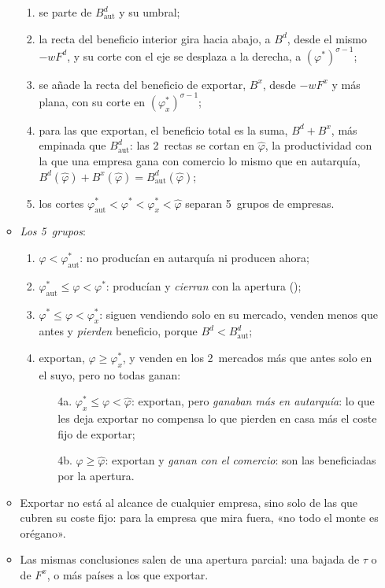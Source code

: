 \documentclass[11pt]{article}
\begin{document}
\begin{itemize}
\begin{itemize}
\begin{enumerate}
    \item se parte de $B^d_{\mathrm{aut}}$ y su umbral;
    \item la recta del beneficio interior gira hacia abajo, a $B^d$, desde el mismo $-wF^d$, y su corte con el eje se desplaza a la derecha, a $(\varphi^*)^{\sigma-1}$;
    \item se añade la recta del beneficio de exportar, $B^x$, desde $-wF^x$ y más plana, con su corte en $(\varphi^*_x)^{\sigma-1}$;
    \item para las que exportan, el beneficio total es la suma, $B^d+B^x$, más empinada que $B^d_{\mathrm{aut}}$: las 2~rectas se cortan en $\hat\varphi$, la productividad con la que una empresa gana con comercio lo mismo que en autarquía, $B^d(\hat\varphi)+B^x(\hat\varphi)=B^d_{\mathrm{aut}}(\hat\varphi)$;
    \item los cortes $\varphi^*_{\mathrm{aut}}<\varphi^*<\varphi^*_x<\hat\varphi$ separan 5~grupos de empresas.
    \end{enumerate}
  \item \emph{Los 5~grupos}:
    \begin{enumerate}
    \item $\varphi<\varphi^*_{\mathrm{aut}}$: no producían en autarquía ni producen ahora;
    \item $\varphi^*_{\mathrm{aut}}\leq\varphi<\varphi^*$: producían y \emph{cierran} con la apertura ();
    \item $\varphi^*\leq\varphi<\varphi^*_x$: siguen vendiendo solo en su mercado, venden menos que antes y \emph{pierden} beneficio, porque $B^d<B^d_{\mathrm{aut}}$;
    \item exportan, $\varphi\geq\varphi^*_x$, y venden en los 2~mercados más que antes solo en el suyo, pero no todas ganan:
      \begin{enumerate}
      \item[4a.] $\varphi^*_x\leq\varphi<\hat\varphi$: exportan, pero \emph{ganaban más en autarquía}: lo que les deja exportar no compensa lo que pierden en casa más el coste fijo de exportar;
      \item[4b.] $\varphi\geq\hat\varphi$: exportan y \emph{ganan con el comercio}: son las beneficiadas por la apertura.
      \end{enumerate}
    \end{enumerate}
  \item Exportar no está al alcance de cualquier empresa, sino solo de las que cubren su coste fijo: para la empresa que mira fuera, «no todo el monte es orégano».
  \item Las mismas conclusiones salen de una apertura parcial: una bajada de $\tau$ o de $F^x$, o más países a los que exportar.
  \end{itemize}
\end{itemize}
\end{document}
